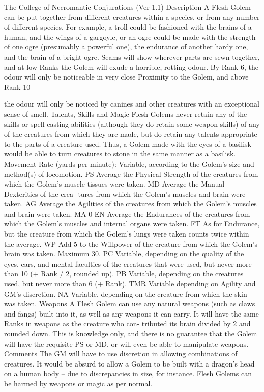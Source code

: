 \begin{Chapter}{The College of Necromantic Conjurations (Ver 1.1)}
Description A Flesh Golem can be put together 
from different creatures within a species, or from 
any number of different species. For example, a 
troll could be fashioned with the brains of a human, 
and the wings of a gargoyle, or an ogre could be 
made with the strength of one ogre (presumably a 
powerful one), the endurance of another hardy one, 
and the brain of a bright ogre. Seams will show 
wherever parts are sewn together, and at low Ranks 
the Golem will exude a horrible, rotting odour. By 
Rank 6, the odour will only be noticeable in very 
close Proximity to the Golem, and above Rank 10 

the odour will only be noticed by canines and other 
creatures with an exceptional sense of smell. 
Talents, Skills and Magic Flesh Golems never 
retain any of the skills or spell casting abilities 
(although they do retain some weapon skills) of 
any of the creatures from which they are made, but 
do retain any talents appropriate to the parts of a 
creature used. Thus, a Golem made with the eyes 
of a basilisk would be able to turn creatures to 
stone in the same manner as a basilisk. 
Movement Rate (yards per minute): Variable, 
according to the Golem’s size and method(s) of 
locomotion. 
PS Average the Physical Strength of the creatures 
from which the Golem’s muscle tissues were taken. 
MD Average the Manual Dexterities of the crea-
tures from which the Golem’s muscles and brain 
were taken. 
AG Average the Agilities of the creatures from 
which the Golem’s muscles and brain were taken. 
MA 0 
EN Average the Endurances of the creatures from 
which the Golem’s muscles and internal organs 
were taken. 
FT As for Endurance, but the creature from which 
the Golem’s lungs were taken counts twice within 
the average. 
WP Add 5 to the Willpower of the creature from 
which the Golem’s brain was taken. Maximum 30. 
PC Variable, depending on the quality of the eyes, 
ears, and mental faculties of the creatures that were 
used, but never more than 10 (+ Rank / 2, rounded 
up). 
PB Variable, depending on the creatures used, but 
never more than 6 (+ Rank). 
TMR Variable depending on Agility and GM’s 
discretion. 
NA Variable, depending on the creature from 
which the skin was taken. 
Weapons A Flesh Golem can use any natural 
weapons (such as claws and fangs) built into it, as 
well as any weapons it can carry. It will have the 
same Ranks in weapons as the creature who con-
tributed its brain divided by 2 and rounded down. 
This is knowledge only, and there is no guarantee 
that the Golem will have the requisite PS or MD, 
or will even be able to manipulate weapons. 
Comments  The  GM will have to use discretion in 
allowing  combinations  of  creatures.  It  would  be 
absurd to allow a Golem to be built with a dragon’s 
head  on  a  human  body  –  due  to  discrepancies  in 
size, for instance. Flesh Golems can be harmed by 
weapons or magic as per normal. 


\end{Chapter}
